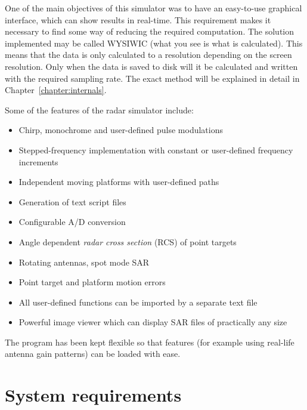 One of the main objectives of this simulator was to have an easy-to-use
graphical interface, which can show results in real-time. This requirement
makes it necessary to find some way of reducing the required computation.
The solution implemented may be called WYSIWIC (what you see is what is
calculated). This means that the data is only calculated to a resolution
depending on the screen resolution. Only when the data is saved to disk will
it be calculated and written with the required sampling rate. The exact
method will be explained in detail in Chapter~\ref{chapter:internals}.

Some of the features of the radar simulator include:

\begin{itemize}
\item  Chirp, monochrome and user-defined pulse modulations

\item  Stepped-frequency implementation with constant or user-defined
frequency increments

\item  Independent moving platforms with user-defined paths

\item  Generation of text script files

\item  Configurable A/D conversion

\item  Angle dependent \textit{radar cross section} (RCS) of point targets

\item  Rotating antennas, spot mode SAR

\item  Point target and platform motion errors

\item  All user-defined functions can be imported by a separate text file

\item  Powerful image viewer which can display SAR files of practically any
size
\end{itemize}

The program has been kept flexible so that features (for example using
real-life antenna gain patterns) can be loaded with ease.

\section{System requirements}

